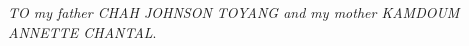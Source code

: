 \vspace*{7cm}
\begin{center}
\noindent \textit{\uppercase{TO} my father \textsc{CHAH JOHNSON TOYANG} and my mother \textsc{KAMDOUM ANNETTE CHANTAL}}.
\end{center}

\myCleanStarChapterEnd
